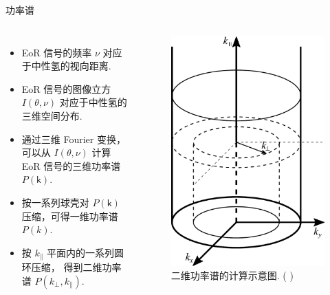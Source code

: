 \documentclass{beamer}
\newcommand{\B}[1]{\bm{\mathsf{#1}}}  %
\newcommand{\citeay}[1]{\citeauthor{#1} \citeyear{#1} \parencite{#1}}
\begin{document}
\begin{frame}{功率谱}
  \begin{columns}
    \begin{itemize}
      \item EoR 信号的频率 $\nu$ 对应于中性氢的视向距离.
      \item EoR 信号的\alert{图像立方} $I(\B{\theta}, \nu)$
        对应于中性氢的三维空间分布.
      \item 通过三维 Fourier 变换，可以从 $I(\B{\theta}, \nu)$
        计算 EoR 信号的\alert{三维功率谱} $P(\B{k})$.
      \item 按一系列球壳对 $P(\B{k})$ 压缩，可得\alert{一维功率谱} $P(k)$.
      \item 按 $k_{\parallel}$ 平面内的一系列圆环压缩，
        得到\alert{二维功率谱} $P(k_{\perp}, k_{\parallel})$.
    \end{itemize}

    \begin{figure}
      \centering
      \includegraphics[width=\columnwidth]{ps2d-annuli-diagram}
      \caption{二维功率谱的计算示意图. (\citeay{thyagarajan2013})}
    \end{figure}
  \end{columns}
\end{frame}
\end{document}

